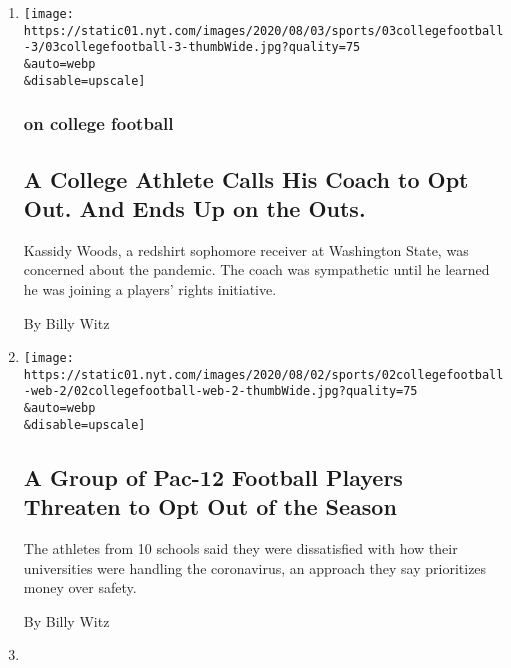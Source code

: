 \begin{enumerate}
\def\labelenumi{\arabic{enumi}.}
\item
  \href{/2020/08/03/sports/coronavirus-college-athletes-opt-out.html}{}

  \texttt{[image: https://static01.nyt.com/images/2020/08/03/sports/03collegefootball-3/03collegefootball-3-thumbWide.jpg?quality=75\\\&auto=webp\\\&disable=upscale]}

  \hypertarget{on-college-football}{%
  \subsubsection{on college football}\label{on-college-football}}

  \hypertarget{a-college-athlete-calls-his-coach-to-opt-out-and-ends-up-on-the-outs}{%
  \subsection{A College Athlete Calls His Coach to Opt Out. And Ends Up
  on the
  Outs.}\label{a-college-athlete-calls-his-coach-to-opt-out-and-ends-up-on-the-outs}}

  Kassidy Woods, a redshirt sophomore receiver at Washington State, was
  concerned about the pandemic. The coach was sympathetic until he
  learned he was joining a players' rights initiative.

  By Billy Witz
\item
  \href{/2020/08/02/sports/ncaafootball/coronavirus-college-football-pac-12.html}{}

  \texttt{[image: https://static01.nyt.com/images/2020/08/02/sports/02collegefootball-web-2/02collegefootball-web-2-thumbWide.jpg?quality=75\\\&auto=webp\\\&disable=upscale]}

  \hypertarget{a-group-of-pac-12-football-players-threaten-to-opt-out-of-the-season}{%
  \subsection{A Group of Pac-12 Football Players Threaten to Opt Out of
  the
  Season}\label{a-group-of-pac-12-football-players-threaten-to-opt-out-of-the-season}}

  The athletes from 10 schools said they were dissatisfied with how
  their universities were handling the coronavirus, an approach they say
  prioritizes money over safety.

  By Billy Witz
\item
  \href{/2020/07/30/sports/coronavirus-sec-schedule.html}{}


\end{enumerate}

